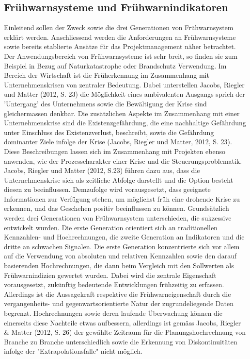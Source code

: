 \subsection{Frühwarnsysteme und Frühwarnindikatoren}
Einleitend sollen der Zweck sowie die drei Generationen von Frühwarnsystem erklärt werden. Anschliessend werden die Anforderungen an Frühwarnsysteme sowie bereits etablierte Ansätze für das Projektmanagement näher betrachtet. 
\newline Der Anwendungsbereich von Frühwarnsysteme ist sehr breit, so finden sie zum Beispiel in Bezug auf Naturkatastrophe oder Brandschutz Verwendung. Im Bereich der Wirtschaft ist die Früherkennung im Zusammenhang mit Unternehmenskrisen von zentraler Bedeutung. Dabei unterstellen Jacobs, Riegler und Matter (2012, S. 23) die Möglichkeit eines ambivalenten Ausgangs sprich der 'Untergang' des Unternehmens sowie die Bewältigung der Krise sind gleichermassen denkbar. Die zusätzlichen Aspekte im Zusammenhang mit einer Unternehmenskrise sind die Existenzgefährdung, die eine nachhaltige Gefährdung unter Einschluss des Existenzverlust, beschreibt, sowie die Gefährdung dominanter Ziele infolge der Krise (Jacobs, Riegler und Matter, 2012, S. 23). Diese Beschreibungen lassen sich im Zusammenhang mit Projekten ebenso anwenden, wie der Prozesscharakter einer Krise und die Steuerungsproblematik. Jacobs, Riegler und Matter (2012, S.23) führen dazu aus, dass die Unternehmenskrise sich als zeitliche Abfolge darstellt und die Option besteht diesen zu beeinflussen. Demzufolge wird vorausgesetzt, dass geeignete Informationen zur Verfügung stehen, um möglichst früh eine drohende Krise zu erkennen, und das Geschehen positiv beeinflussen zu können.
\newline
Grundsätzlich werden drei Generationen von Frühwarnsystem unterschieden, die sukzessive entwickelt wurden. Die erste Generation orientiert sich an traditionellen Kennzahlen- und Hochrechnungen, die zweite Generation an Indikatoren und die dritte an schwachen Signalen. 
\newline
Die erste Generation konzentrierte sich vor allem auf die Verwendung von absoluten und relativen Kennzahlen sowie den darauf basierenden Hochrechnungen, die dann beim Vergleich mit den Sollwerten als Frühwarnindizien gewertet wurden. Dabei wird die zentrale Eigenschaft vorausgesetzt, zukünftig bedeutende Entwicklungen frühzeitig zu erfassen. Allerdings ist die Aussagekraft respektive die Frühwarneigenschaft durch die vergangenheits- und gegenwartsorientierte Natur der zugrundeliegende Daten begrenzt. Hochrechnungen sowie deren laufende Überwachung können die einerseits diese Nachteile etwas aufbessern, allerdings ist gemäss Jacobs, Riegler \& Matter (2012, S. 26) der gewählte Zeitraum für die Planungshochrechnung von Branche zu Branche unterschiedlich sowie die Erkennung von Diskontinuitäten infolge der "Extrapolationsfalle" nicht möglich.
